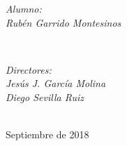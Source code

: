 \documentclass[12pt,twoside,openany]{report}     %
\begin{document}
\begin{titlepage}
                \begin{minipage}{0.5\textwidth}
                        \begin{flushleft} \large
                                \emph{Alumno:}\\
                                \emph{Rubén Garrido Montesinos}
                        \end{flushleft}
                \end{minipage}
                ~
                \begin{minipage}{0.45\textwidth}
                        \begin{flushright} \large
                                \emph{Directores:} \\
                                \emph{Jesús J. García Molina}\\
                                \emph{Diego Sevilla Ruiz}
                        \end{flushright}
                \end{minipage}\\[1.5cm]








                {\large Septiembre de 2018}\\[1cm] %



                \vfill %

        \end{titlepage}





\end{document}
